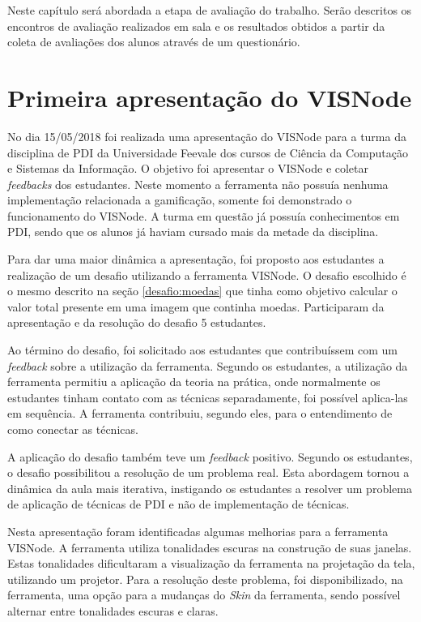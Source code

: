 \documentclass[
	12pt,				%
	oneside,			%
	a4paper,			%
	english,			%
	french,				%
	spanish,			%
	brazil,				%
	]{abntex2}
\begin{document}
Neste capítulo será abordada a etapa de avaliação do trabalho. Serão descritos os encontros de avaliação realizados em sala e os resultados obtidos a partir da coleta de avaliações dos alunos através de um questionário.

\section{Primeira apresentação do VISNode}
\label{validacao:piloto1}

No dia 15/05/2018 foi realizada uma apresentação do VISNode para a turma da disciplina de PDI da Universidade Feevale dos cursos de Ciência da Computação e Sistemas da Informação. O objetivo  foi apresentar o VISNode e coletar \textit{feedbacks} dos estudantes. Neste momento a ferramenta não possuía nenhuma implementação relacionada a gamificação, somente foi demonstrado o funcionamento do VISNode. A turma em questão já possuía conhecimentos em PDI, sendo que os alunos já haviam cursado mais da metade da disciplina.

Para dar uma maior dinâmica a apresentação, foi proposto aos estudantes a realização de um desafio utilizando a ferramenta VISNode. O desafio escolhido é o mesmo descrito na seção \ref{desafio:moedas} que tinha como objetivo calcular o valor total presente em uma imagem que continha moedas. Participaram da apresentação e da resolução do desafio 5 estudantes.

Ao término do desafio, foi solicitado aos estudantes que contribuíssem com um \textit{feedback} sobre a utilização da ferramenta. Segundo os estudantes, a utilização da ferramenta permitiu a aplicação da teoria na prática, onde normalmente os estudantes tinham contato com as técnicas separadamente, foi possível aplica-las em sequência. A ferramenta contribuiu, segundo eles, para o entendimento de como conectar as técnicas.

A aplicação do desafio também teve um \textit{feedback} positivo. Segundo os estudantes, o desafio possibilitou a resolução de um problema real. Esta abordagem tornou a dinâmica da aula mais iterativa, instigando os estudantes a resolver um problema de aplicação de técnicas de PDI e não de implementação de técnicas.

Nesta apresentação foram identificadas algumas melhorias para a ferramenta VISNode. A ferramenta utiliza tonalidades escuras na construção de suas janelas. Estas tonalidades dificultaram a visualização da ferramenta na projetação da tela, utilizando um projetor. Para a resolução deste problema, foi disponibilizado, na ferramenta, uma opção para a mudanças do \textit{Skin} da ferramenta, sendo possível alternar entre tonalidades escuras e claras.
\end{document}

